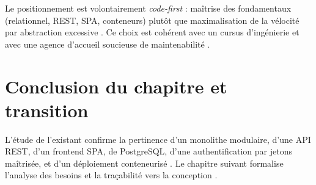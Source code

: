 Le positionnement est volontairement \emph{code-first} : maîtrise des fondamentaux (relationnel, REST, SPA, conteneurs) plutôt que maximalisation de la vélocité par abstraction excessive \cite{gamma1994,fowler2002}. Ce choix est cohérent avec un cursus d'ingénierie et avec une agence d'accueil soucieuse de maintenabilité \cite{bass2021}.

\section{Conclusion du chapitre et transition}

L'étude de l'existant confirme la pertinence d'un monolithe modulaire, d'une API REST, d'un frontend SPA, de PostgreSQL, d'une authentification par jetons maîtrisée, et d'un déploiement conteneurisé \cite{dockerdoc,postgresdoc}. Le chapitre suivant formalise l'analyse des besoins et la traçabilité vers la conception \cite{sommerville2016,booch2005}.
